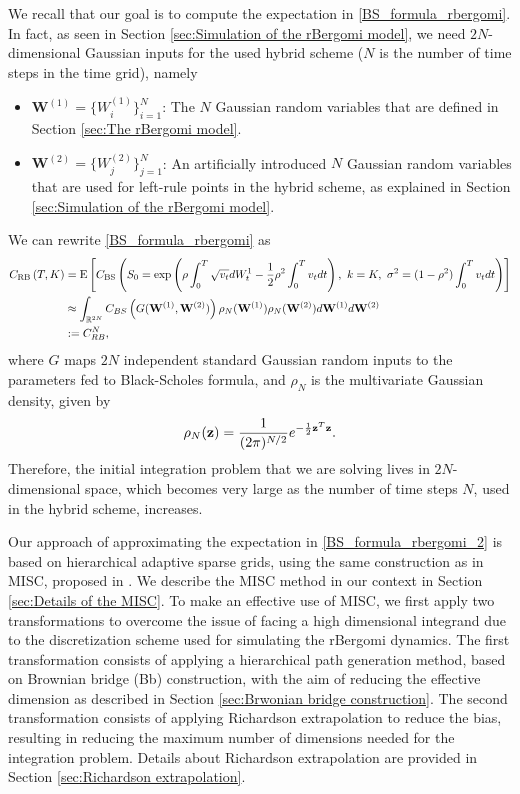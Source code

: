 We recall that our goal is to compute the expectation in \eqref{BS_formula_rbergomi}. In fact, as seen in Section \ref{sec:Simulation of the rBergomi model}, we need   $2N$-dimensional Gaussian inputs for the used  hybrid  scheme ($N$ is the number of time steps in  the time grid), namely
\begin{itemize}
	\item $\mathbf{W}^{(1)}=\{W^{(1)}_i\}_{i=1}^N$: The $N$ Gaussian random variables that are defined in Section  \ref{sec:The rBergomi model}.
	\item $\mathbf{W}^{(2)}=\{W^{(2)}_j\}_{j=1}^N$: An artificially introduced $N$ Gaussian random variables that are used for left-rule points in the hybrid scheme, as explained in Section  \ref{sec:Simulation of the rBergomi model}.
\end{itemize}
We can rewrite \eqref{BS_formula_rbergomi} as 
\begin{align}\label{BS_formula_rbergomi_2}
C_{\text{RB}}\left( T, K \right)&=\text{E}\left[C_{\text{BS}}\left( S_0 = \operatorname{exp}\left(\rho \int_0^T \sqrt{v_t} dW_t^1 - \frac{1}{2}
\rho^2 \int_0^T v_t dt\right),\ k = K, \ \sigma^2 = (1-\rho^2)
\int_0^T v_t dt \right) \right] \nonumber \\
&\approx \int_{\mathbb{R}^{2N}} C_{BS} \left(G(\mathbf{W}^{(1)},\mathbf{W}^{(2)})\right) \rho_{N}(\mathbf{W}^{(1)})  \rho_{N}(\mathbf{W}^{(2)}) d\mathbf{W}^{(1)} d\mathbf{W}^{(2)} \nonumber \\
&:=C_{RB}^{N},
\end{align}
where $G$  maps  $2N$ independent standard Gaussian random inputs to the parameters fed to Black-Scholes formula, and  $\rho_N$ is the multivariate Gaussian density, given by 
\begin{equation*}\label{eq: multivariate gaussian distribution}
\rho_N(\mathbf{z})=\frac{1}{(2 \pi)^{N/2}} e^{-\frac{1}{2} \mathbf{z}^T \mathbf{z}} .
\end{equation*} 
Therefore, the initial integration problem that we are solving lives in $2N$-dimensional space, which becomes very large as the number of time steps $N$, used in the hybrid scheme, increases.

Our approach of approximating the expectation in \eqref{BS_formula_rbergomi_2} is based on  hierarchical adaptive sparse grids, using the same construction as in MISC, proposed in \cite{haji2016multi}. We describe the  MISC method in our context in Section \ref{sec:Details of the MISC}.  To make an effective use of MISC, we  first apply two transformations to overcome the issue of facing a high dimensional integrand due to the discretization scheme used for simulating the rBergomi dynamics. The first transformation consists of applying a hierarchical  path generation method, based on Brownian bridge (Bb) construction, with the aim of reducing the effective dimension as  described  in Section \ref{sec:Brwonian bridge construction}. The second transformation consists of applying Richardson extrapolation to reduce the bias, resulting in reducing  the maximum number of dimensions needed for the integration problem. Details about  Richardson extrapolation  are provided in Section \ref{sec:Richardson extrapolation}.

